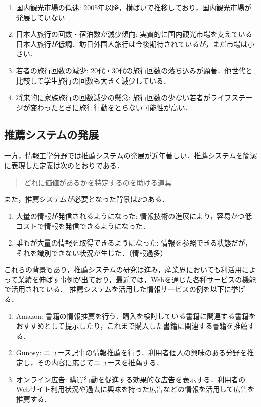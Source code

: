 \documentclass{jsarticle}
\begin{document}
\begin{enumerate}
\item 国内観光市場の低迷: 2005年以降，横ばいで推移しており，国内観光市場が発展していない
\item 日本人旅行の回数・宿泊数が減少傾向: 実質的に国内観光市場を支えている日本人旅行が低調．訪日外国人旅行は今後期待されているが，まだ市場は小さい．
\item 若者の旅行回数の減少: 20代・30代の旅行回数の落ち込みが顕著．他世代と比較して学生旅行の回数も大きく減少している．
\item 将来的に家族旅行の回数減少の懸念: 旅行回数の少ない若者がライフステージが変わったときに旅行行動をとらない可能性が高い．
\end{enumerate}

\subsection{推薦システムの発展}
\label{evolution_recommendation_system}

一方，情報工学分野では推薦システムの発展が近年著しい．推薦システムを簡潔に表現した定義は次のとおりである\cite{define_of_recommendation_system}．

\begin{quote}
どれに価値があるかを特定するのを助ける道具
\end{quote}

また，推薦システムが必要となった背景は2つある\cite{kamishima_recommendation}．

\begin{enumerate}
\item 大量の情報が発信されるようになった: 情報技術の進展により，容易かつ低コストで情報を発信できるようになった．
\item 誰もが大量の情報を取得できるようになった: 情報を参照できる状態だが，それを識別できない状況が生じた．（情報過多\cite{information_overload}）
\end{enumerate}

これらの背景もあり，推薦システムの研究は進み，産業界においても利活用によって業績を伸ばす事例が出ており，最近では，Webを通じた各種サービスの機能で活用されている．
推薦システムを活用した情報サービスの例を以下に挙げる．

\begin{enumerate}
\item Amazon: 書籍の情報推薦を行う．購入を検討している書籍に関連する書籍をおすすめとして提示したり，これまで購入した書籍に関連する書籍を推薦する．
\item Gunosy: ニュース記事の情報推薦を行う．利用者個人の興味のある分野を推定し，その内容に応じてニュースを推薦する．
\item オンライン広告: 購買行動を促進する効果的な広告を表示する．利用者のWebサイト利用状況や過去に興味を持った広告などの情報を活用して広告を推薦する．
\end{enumerate}
\end{document}

